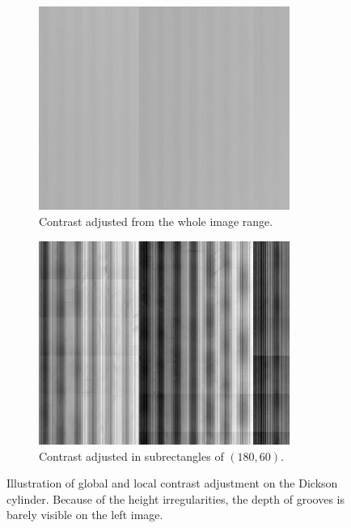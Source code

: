 \begin{figure}[!ht]
    \begin{subfigure}[t]{0.49\textwidth}
    \centering
    \includegraphics[width=0.9\textwidth]{images/contrast-global}
    \caption{Contrast adjusted from the whole image range.}
    \label{fig:contrastlocal}
    \end{subfigure}
    \begin{subfigure}[t]{0.49\textwidth}
    \centering
    \includegraphics[width=0.9\textwidth]{images/contrast-local}
    \caption{Contrast adjusted in subrectangles of $(180,60)$.}
    \label{fig:contrastglobal}
    \end{subfigure}
    \caption{Illustration of global and local contrast adjustment on the Dickson cylinder. Because of the height irregularities, the depth of grooves is barely visible on the left image.}
    \label{fig:contrastimage}
\end{figure}

